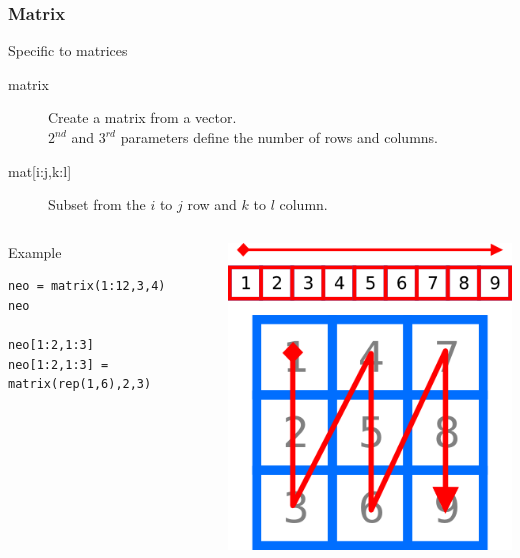 \documentclass[10pt]{beamer}
\newenvironment{xframe}[2][]
  {\begin{frame}[fragile,environment=xframe,#1]
  \frametitle{#2}}
  {\end{frame}}
\begin{document}
\begin{xframe}{Matrix}
  \begin{block}{Specific to matrices}
    \begin{description}
    \item[matrix] Create a matrix from a vector. \\$2^{nd}$ and $3^{rd}$ parameters define the number of rows and columns.
    \item[{mat[i:j,k:l]} ] Subset from the $i$ to $j$ row and $k$ to $l$ column.
    \end{description}    
  \end{block}
  \begin{columns}
    \begin{column}{.7\textwidth}
  \begin{exampleblock}{Example}
\begin{verbatim}
neo = matrix(1:12,3,4)
neo

neo[1:2,1:3]
neo[1:2,1:3] = matrix(rep(1,6),2,3)
\end{verbatim}
  \end{exampleblock}
    \end{column}
    \begin{column}{.3\textwidth}
      \includegraphics[width=\linewidth]{imgs/matrixFillUpScheme.png}
    \end{column}
  \end{columns}
\end{xframe}
\end{document}
